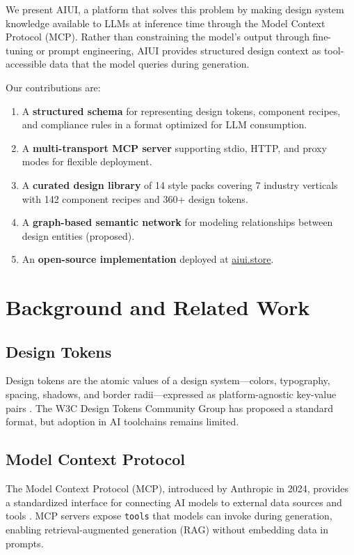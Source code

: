 \documentclass[11pt,twocolumn]{article}
\begin{document}
We present AIUI, a platform that solves this problem by making design system knowledge available to LLMs at inference time through the Model Context Protocol (MCP). Rather than constraining the model's output through fine-tuning or prompt engineering, AIUI provides structured design context as tool-accessible data that the model queries during generation.

Our contributions are:
\begin{enumerate}[nosep]
  \item A \textbf{structured schema} for representing design tokens, component recipes, and compliance rules in a format optimized for LLM consumption.
  \item A \textbf{multi-transport MCP server} supporting stdio, HTTP, and proxy modes for flexible deployment.
  \item A \textbf{curated design library} of 14 style packs covering 7 industry verticals with 142 component recipes and 360+ design tokens.
  \item A \textbf{graph-based semantic network} for modeling relationships between design entities (proposed).
  \item An \textbf{open-source implementation} deployed at \href{https://aiui.store}{aiui.store}.
\end{enumerate}

\section{Background and Related Work}

\subsection{Design Tokens}
Design tokens are the atomic values of a design system---colors, typography, spacing, shadows, and border radii---expressed as platform-agnostic key-value pairs \cite{designtokens2024}. The W3C Design Tokens Community Group has proposed a standard format, but adoption in AI toolchains remains limited.

\subsection{Model Context Protocol}
The Model Context Protocol (MCP), introduced by Anthropic in 2024, provides a standardized interface for connecting AI models to external data sources and tools \cite{anthropic2024mcp}. MCP servers expose \texttt{tools} that models can invoke during generation, enabling retrieval-augmented generation (RAG) without embedding data in prompts.
\end{document}
